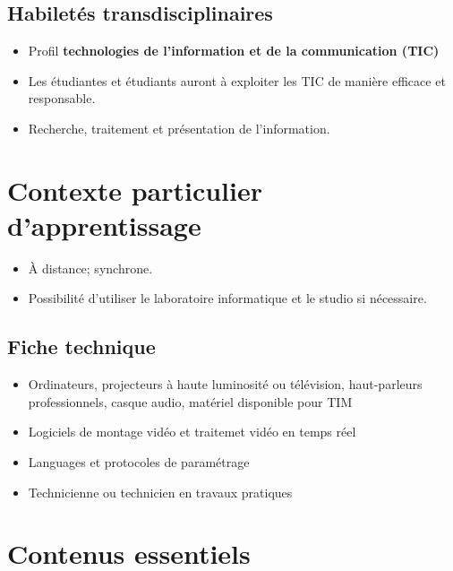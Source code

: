 \documentclass[
]{book}
\providecommand{\tightlist}{%
  \setlength{\itemsep}{0pt}\setlength{\parskip}{0pt}}
\begin{document}
\hypertarget{habiletuxe9s-transdisciplinaires}{%
\subsection{Habiletés transdisciplinaires}\label{habiletuxe9s-transdisciplinaires}}

\begin{itemize}
\tightlist
\item
  Profil \textbf{technologies de l'information et de la communication (TIC)}
\item
  Les étudiantes et étudiants auront à exploiter les TIC de manière efficace et responsable.
\item
  Recherche, traitement et présentation de l'information.
\end{itemize}

\hypertarget{contexte-particulier-dapprentissage}{%
\section{Contexte particulier d'apprentissage}\label{contexte-particulier-dapprentissage}}

\begin{itemize}
\tightlist
\item
  À distance; synchrone.
\item
  Possibilité d'utiliser le laboratoire informatique et le studio si nécessaire.
\end{itemize}

\hypertarget{fiche-technique}{%
\subsection{Fiche technique}\label{fiche-technique}}

\begin{itemize}
\tightlist
\item
  Ordinateurs, projecteurs à haute luminosité ou télévision, haut-parleurs professionnels, casque audio, matériel disponible pour TIM
\item
  Logiciels de montage vidéo et traitemet vidéo en temps réel
\item
  Languages et protocoles de paramétrage\\
\item
  Technicienne ou technicien en travaux pratiques
\end{itemize}

\hypertarget{contenus_essentiels}{%
\section{Contenus essentiels}\label{contenus_essentiels}}
\end{document}
